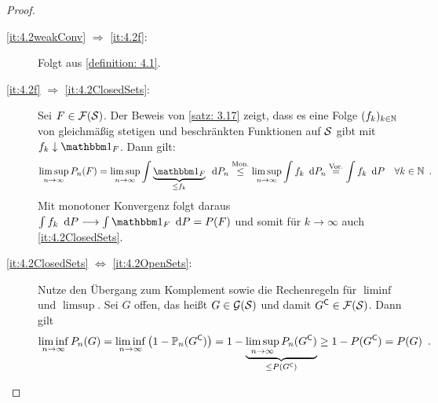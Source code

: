 \begin{proof}
	\begin{description}
		\item[\ref{it:4.2weakConv} $\Rightarrow$ \ref{it:4.2f}:] 
		Folgt aus \cref{definition: 4.1}.
		\item[\ref{it:4.2f} $\Rightarrow$ \ref{it:4.2ClosedSets}:] 
		Sei $F \in\F(\S)$. Der Beweis von \cref{satz: 3.17} zeigt, dass es eine Folge $(f_k)_{k \in \N}$ von gleichmäßig stetigen und beschränkten Funktionen auf $\S$ gibt mit $f_k \downarrow \one_F$. Dann gilt:
		\begin{equation*}
			\limsup_{n \to \infty} P_n(F)
			= \limsup_{n \to \infty} \int \underbrace{\one_F}_{\le f_k} \diffskip P_n
			\overset{\text{Mon.}}{\le}
			\limsup_{n \to \infty} \int f_k \diffskip P_n
			\overset{\text{Vor.}}{=}
			\int f_k \diffskip P \quad \forall k \in \N 
			\satzende
		\end{equation*}
		Mit monotoner Konvergenz folgt daraus $\int f_k \diffskip P \longrightarrow \int \one_F \diffskip  P = P(F)$ und somit für $k \to \infty$ auch \ref{it:4.2ClosedSets}.
		\item[\ref{it:4.2ClosedSets} $\Leftrightarrow$ \ref{it:4.2OpenSets}:]
		Nutze den Übergang zum Komplement sowie die Rechenregeln für $\liminf$ und $\limsup$. Sei $G$ offen, das heißt $G \in \G(\S)$ und damit $G^\complement \in \F(\S)$. Dann gilt
		\begin{equation*}
			\liminf_{n \to \infty} P_n(G)
			= \liminf_{n \to \infty} \brackets{1-\P_n(G^\complement)}
			= 1 - \underbrace{\limsup_{n \to \infty} P_n(G^\complement)}_{\le P(G^\complement)}
			\ge 1 - P(G^\complement)
			= P(G) 
			\satzende
		\end{equation*}
	\end{description}


\end{proof}
